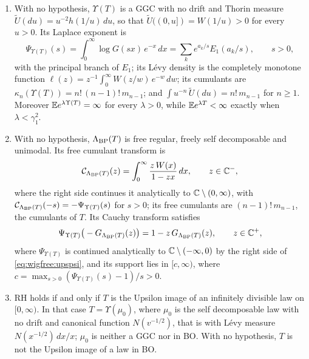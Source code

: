 \begin{theorem}\label{thm:wigfree:clock}
\begin{enumerate}
\item[(a)] With no hypothesis, $\Upsilon(T)$ is a GGC with no drift and Thorin measure $\widetilde U(du)=u^{-2}h(1/u)\,du$, so that $\widetilde U((0,u])=W(1/u)>0$ for every $u>0$. Its Laplace exponent is
\begin{equation}\label{eq:wigfree:psiclock}
\Psi_{\Upsilon(T)}(s)=\int_0^\infty\log G(sx)\,e^{-x}\,dx=\sum_ke^{a_k/s}E_1(a_k/s),\qquad s>0,
\end{equation}
with the principal branch of $E_1$; its L\'evy density is the completely monotone function $\ell(z)=z^{-1}\int_0^\infty W(z/w)\,e^{-w}\,dw$; its cumulants are $\kappa_n(\Upsilon(T))=n!\,(n-1)!\,m_{n-1}$; and $\int u^{-n}\,\widetilde U(du)=n!\,m_{n-1}$ for $n\ge1$. Moreover $\mathbb{E} e^{\lambda\Upsilon(T)}=\infty$ for every $\lambda>0$, while $\mathbb{E} e^{\lambda T}<\infty$ exactly when $\lambda<\gamma_1^2$.
\item[(b)] With no hypothesis, $\Lambda_{\rm BP}(T)$ is free regular, freely self decomposable and unimodal. Its free cumulant transform is
\begin{equation}\label{eq:wigfree:freeclock}
\mathcal C_{\Lambda_{\rm BP}(T)}(z)=\int_0^\infty\frac{z\,W(x)}{1-zx}\,dx,\qquad z\in\mathbb{C}^-,
\end{equation}
where the right side continues it analytically to $\mathbb{C}\setminus(0,\infty)$, with $\mathcal C_{\Lambda_{\rm BP}(T)}(-s)=-\Psi_{\Upsilon(T)}(s)$ for $s>0$; its free cumulants are $(n-1)!\,m_{n-1}$, the cumulants of $T$. Its Cauchy transform satisfies
\begin{equation}\label{eq:wigfree:cauchy}
\Psi_{\Upsilon(T)}\big(-G_{\Lambda_{\rm BP}(T)}(z)\big)=1-z\,G_{\Lambda_{\rm BP}(T)}(z),\qquad z\in\mathbb{C}^+,
\end{equation}
where $\Psi_{\Upsilon(T)}$ is continued analytically to $\mathbb{C}\setminus(-\infty,0)$ by the right side of \eqref{eq:wigfree:upspsi}, and its support lies in $[c,\infty)$, where $c=\max_{s>0}(\Psi_{\Upsilon(T)}(s)-1)/s>0$.
\item[(c)] RH holds if and only if $T$ is the Upsilon image of an infinitely divisible law on $[0,\infty)$. In that case $T=\Upsilon(\mu_0)$, where $\mu_0$ is the self decomposable law with no drift and canonical function $N(v^{-1/2})$, that is with L\'evy measure $N(x^{-1/2})\,dx/x$; $\mu_0$ is neither a GGC nor in BO. With no hypothesis, $T$ is not the Upsilon image of a law in BO.
\end{enumerate}
\end{theorem}

